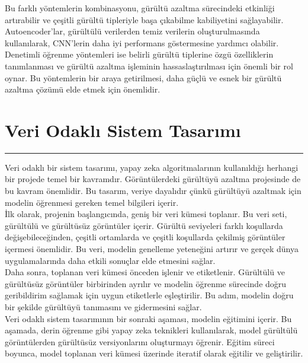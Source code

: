 \documentclass{article}
\begin{document}
 \noindent Bu farklı yöntemlerin kombinasyonu, gürültü azaltma sürecindeki etkinliği artırabilir ve çeşitli gürültü tipleriyle başa çıkabilme kabiliyetini sağlayabilir. Autoencoder'lar, gürültülü verilerden temiz verilerin oluşturulmasında kullanılarak, CNN'lerin daha iyi performans göstermesine yardımcı olabilir. Denetimli öğrenme yöntemleri ise belirli gürültü tiplerine özgü özelliklerin tanımlanması ve gürültü azaltma işleminin hassaslaştırılması için önemli bir rol oynar. Bu yöntemlerin bir araya getirilmesi, daha güçlü ve esnek bir gürültü azaltma çözümü elde etmek için önemlidir.\\[10pt]

 \section{Veri Odaklı Sistem Tasarımı}
\rule{\textwidth}{0.5pt}

 \noindent Veri odaklı bir sistem tasarımı, yapay zeka algoritmalarının kullanıldığı herhangi bir projede temel bir kavramdır. Görüntülerdeki gürültüyü azaltma projesinde de bu kavram önemlidir. Bu tasarım, veriye dayalıdır çünkü gürültüyü azaltmak için modelin öğrenmesi gereken temel bilgileri içerir.\\[10pt]

 \noindent İlk olarak, projenin başlangıcında, geniş bir veri kümesi toplanır. Bu veri seti, gürültülü ve gürültüsüz görüntüler içerir. Gürültü seviyeleri farklı koşullarda değişebileceğinden, çeşitli ortamlarda ve çeşitli koşullarda çekilmiş görüntüler içermesi önemlidir. Bu veri, modelin genelleme yeteneğini artırır ve gerçek dünya uygulamalarında daha etkili sonuçlar elde etmesini sağlar.\\[10pt]

\noindent Daha sonra, toplanan veri kümesi önceden işlenir ve etiketlenir. Gürültülü ve gürültüsüz görüntüler birbirinden ayrılır ve modelin öğrenme sürecinde doğru geribildirim sağlamak için uygun etiketlerle eşleştirilir. Bu adım, modelin doğru bir şekilde gürültüyü tanımasını ve gidermesini sağlar.\\[10pt]

\noindent Veri odaklı sistem tasarımının bir sonraki aşaması, modelin eğitimini içerir. Bu aşamada, derin öğrenme gibi yapay zeka teknikleri kullanılarak, model gürültülü görüntülerden gürültüsüz versiyonlarını oluşturmayı öğrenir. Eğitim süreci boyunca, model toplanan veri kümesi üzerinde iteratif olarak eğitilir ve geliştirilir.\\[10pt]
\end{document}
